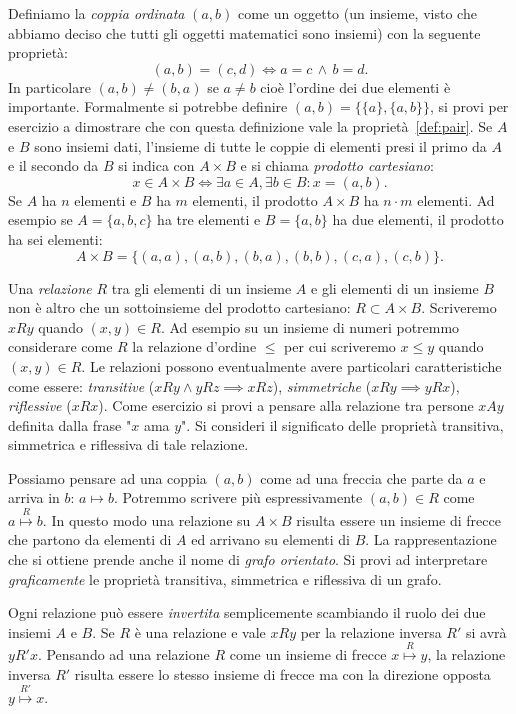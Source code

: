 \documentclass[italian,a4paper,hidelinks]{scrartcl}
\newcommand{\myemph}[1]{\emph{#1}\marginpar{#1}}
\begin{document}
Definiamo la \myemph{coppia ordinata} $(a,b)$ come un oggetto (un insieme,
visto che abbiamo deciso che tutti gli oggetti matematici sono insiemi) con
la seguente proprietà:
\begin{equation}\label{def:pair}
  (a,b) = (c,d) \iff a=c\, \wedge \,b=d.
\end{equation}
In particolare $(a,b) \neq (b,a)$ se $a\neq b$ cioè l'ordine dei due elementi
è importante.
Formalmente si potrebbe definire $(a,b)=\{\{a\}, \{a,b\}\}$,
si provi per esercizio a dimostrare che con questa definizione vale la
proprietà~\eqref{def:pair}.
Se $A$ e $B$ sono insiemi dati, l'insieme di tutte le coppie di elementi
presi il primo da $A$ e il secondo da $B$ si indica con $A \times B$ e si chiama
\myemph{prodotto cartesiano}:
\[
x \in A \times B \iff \exists a \in A, \exists b \in B\colon x = (a,b).
\]
Se $A$ ha $n$ elementi e $B$ ha $m$ elementi, il prodotto $A\times B$ ha $n\cdot m$
elementi. Ad esempio se $A=\{a,b,c\}$ ha tre elementi e $B=\{a,b\}$ ha due elementi,
il prodotto ha sei elementi:
\[
  A \times B = \{(a,a), (a,b), (b,a), (b,b), (c,a), (c,b)\}.
\]

Una \myemph{relazione} $R$ tra gli elementi di un insieme $A$
e gli elementi di un insieme $B$
non è altro che un sottoinsieme del prodotto cartesiano: $R\subset A \times B$.
Scriveremo $x R y$ quando $(x,y) \in R$.
Ad esempio su un insieme di numeri potremmo considerare come $R$ la relazione d'ordine
$\le$ per cui scriveremo $x \le y$ quando $(x,y)\in R$.
Le relazioni possono eventualmente avere particolari caratteristiche
come essere: \emph{transitive} ($xRy \wedge yR z \implies x R z$),
\emph{simmetriche} ($xRy \implies yRx$),
\emph{riflessive} ($xRx$).
Come esercizio si provi a pensare alla relazione tra persone $xAy$
definita dalla frase "$x$ ama $y$".
Si consideri il significato delle proprietà transitiva, simmetrica
e riflessiva di tale relazione.

Possiamo pensare ad una coppia $(a,b)$ come ad una freccia che
parte da $a$ e arriva in $b$: $a \mapsto b$.
Potremmo scrivere più espressivamente $(a,b)\in R$ come
$a \stackrel{R}\mapsto b$.
In questo modo una relazione su $A\times B$
risulta essere un insieme di frecce che partono da elementi di $A$
ed arrivano su elementi di $B$. La rappresentazione che si ottiene prende
anche il nome di \emph{grafo orientato}.
Si provi ad interpretare \emph{graficamente} le proprietà
transitiva, simmetrica e riflessiva di un grafo.

Ogni relazione può essere \emph{invertita}
semplicemente scambiando il ruolo
dei due insiemi $A$ e $B$. Se $R$ è una relazione e vale $x R y$
per la relazione inversa $R'$ si avrà
$y R' x$.
Pensando ad una relazione $R$ come un insieme di frecce
$x\stackrel R \mapsto y$,
la relazione inversa $R'$ risulta essere lo stesso insieme di frecce ma
con la direzione opposta $y\stackrel{R'} \mapsto x$.
\end{document}
